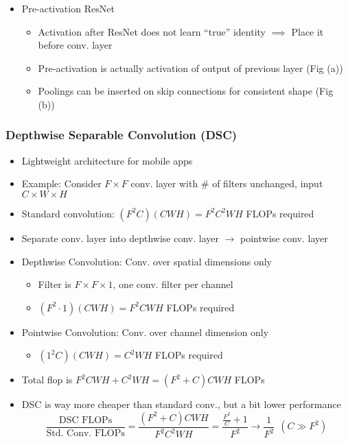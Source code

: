 \begin{itemize}
\begin{itemize}
    \end{itemize}
    \item Pre-activation ResNet
    \begin{itemize}
        \item Activation after ResNet does not learn ``true'' identity $\implies$ Place it before conv. layer
        \item Pre-activation is actually activation of output of previous layer (Fig (a))
        \item Poolings can be inserted on skip connections for consistent shape (Fig (b))
    \end{itemize}
    \begin{figures}
    \end{figures}
\end{itemize}

\subsubsection*{Depthwise Separable Convolution (DSC)}
\begin{itemize}
    \item Lightweight architecture for mobile apps
    \item Example: Consider $F\times F$ conv. layer with \# of filters unchanged, input $C\times W\times H$
    \item Standard convolution: $(F^2C)(CWH)=F^2C^2WH$ FLOPs required
    \item Separate conv. layer into depthwise conv. layer $\rightarrow$ pointwise conv. layer
    \item Depthwise Convolution: Conv. over spatial dimensions only
    \begin{itemize}
        \item Filter is $F\times F\times 1$, one conv. filter per channel
        \item $(F^2\cdot1)(CWH)=F^2CWH$ FLOPs required
    \end{itemize}
    \item Pointwise Convolution: Conv. over channel dimension only
    \begin{itemize}
        \item $(1^2C)(CWH)=C^2WH$ FLOPs required
    \end{itemize}
    \item Total flop is $F^2CWH+C^2WH=(F^2+C)CWH$ FLOPs
    \item DSC is way more cheaper than standard conv., but a bit lower performance
    \begin{equation}
        \frac{\text{DSC~FLOPs}}{\text{Std.~Conv.~FLOPs}}=\frac{(F^2+C)CWH}{F^2C^2WH}=\frac{\frac{F^2}{C}+1}{F^2}\to\frac{1}{F^2}~~(C\gg F^2)
    \end{equation}
\end{itemize}
\begin{figures}
\end{figures}
